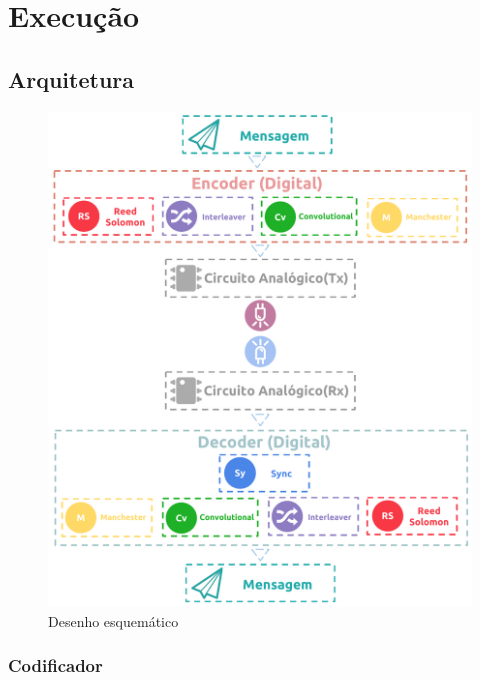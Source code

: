 	\chapter{Execução}\label{cap-execucao}
	
	\section{Arquitetura}
	
	\begin{figure}[htb]
		\caption{\label{fig_arch} Desenho esquemático}
		\centering
		\includegraphics[width=1\textwidth]{Arquitetura}
	\end{figure}
	
	
	\subsection{Codificador}
	
